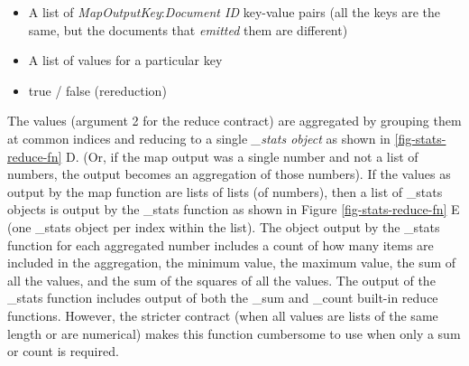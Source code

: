 \begin{itemize}
    \item A list of \textit{MapOutputKey}:\textit{Document ID} key-value pairs (all the keys are the same, but the documents that \textit{emitted} them are different)
    \item A list of values for a particular key
    \item true / false (rereduction)
\end{itemize}

The values (argument 2 for the reduce contract) are aggregated by grouping them at common indices and reducing to a single \textit{\_stats object} as shown in \ref{fig-stats-reduce-fn} D. (Or, if the map output was a single number and not a list of numbers, the output becomes an aggregation of those numbers). If the values as output by the map function are lists of lists (of numbers), then a list of \_stats objects is output by the \_stats function as shown in Figure \ref{fig-stats-reduce-fn} E (one \_stats object per index within the list). The object output by the \_stats function for each aggregated number includes a count of how many items are included in the aggregation, the minimum value, the maximum value, the sum of all the values, and the sum of the squares of all the values. The output of the \_stats function includes output of both the \_sum and \_count built-in reduce functions. However, the stricter contract (when all values are lists of the same length or are numerical) makes this function cumbersome to use when only a sum or count is required.

